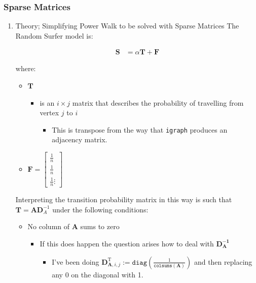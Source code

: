 \documentclass[11pt]{article}
\begin{document}
\subsubsection{Sparse Matrices}
\label{sec:orgf7c4767}
\begin{enumerate}
\item Theory; Simplifying Power Walk to be solved with Sparse Matrices
\label{sec:org6d6637f}
The Random Surfer model is:

$$\begin{aligned}
    \mathbf{S} &= \alpha \mathbf{T} +  \mathbf{F}  \label{eq:sparse-RS}\end{aligned}$$

where:

\begin{itemize}
\item \(\mathbf{T}\)

\begin{itemize}
\item is an \(i \times j\) matrix that describes the probability of
travelling from vertex \(j\) to \(i\)

\begin{itemize}
\item This is transpose from the way that \texttt{igraph} produces an adjacency
matrix.
\end{itemize}
\end{itemize}

\item \(\mathbf{F} = \begin{bmatrix} \frac{1}{n} \\ \frac{1}{n} \\ \frac{1}{n} \vdots \end{bmatrix}\)
\end{itemize}

Interpreting the transition probability matrix in this way is such that
\(\mathbf{T}= \mathbf{A}\mathbf{D}^{- 1}_A\) under the following
conditions:


\begin{itemize}
\item No column of \(\mathbf{A}\) sums to zero

\begin{itemize}
\item If this does happen the question arises how to deal with
\(\mathbf{D_\mathbf{A}^{- 1}}\)

\begin{itemize}
\item I've been doing \(\mathbf{D}^{\mathrm{T}}_{\mathbf{A}, i, j} := \mathtt{diag} \left( {\frac{1}{\mathtt{colsums}\left( \mathbf{A} \right)}} \right)\)
and then replacing any \(0\) on the diagonal with 1.
\end{itemize}


\end{itemize}
\end{itemize}
\end{enumerate}
\end{document}
